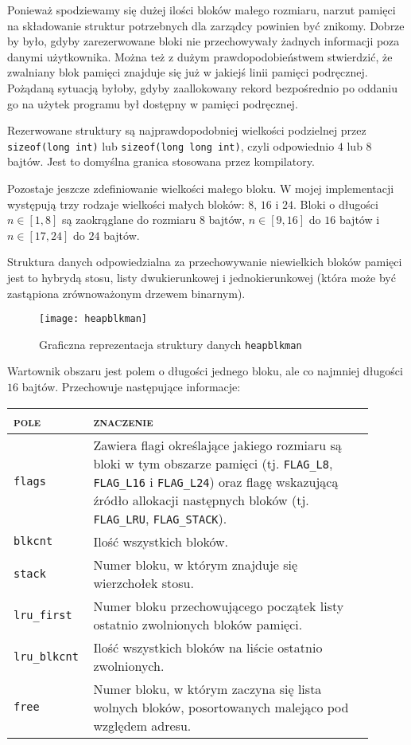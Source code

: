 \documentclass[12pt,a4paper,titlepage,twoside]{mwart}
\begin{document}
Ponieważ spodziewamy się dużej ilości bloków małego rozmiaru, narzut pamięci na
składowanie struktur potrzebnych dla zarządcy powinien być znikomy. Dobrze by
było, gdyby zarezerwowane bloki nie przechowywały żadnych informacji poza
danymi użytkownika. Można też z dużym prawdopodobieństwem stwierdzić, że
zwalniany blok pamięci znajduje się już w jakiejś linii pamięci podręcznej.
Pożądaną sytuacją byłoby, gdyby zaallokowany rekord bezpośrednio po oddaniu go
na użytek programu był dostępny w pamięci podręcznej.

Rezerwowane struktury są najprawdopodobniej wielkości podzielnej przez
\texttt{sizeof(long int)} lub \texttt{sizeof(long long int)}, czyli odpowiednio
$4$ lub $8$ bajtów. Jest to domyślna granica stosowana przez kompilatory.

Pozostaje jeszcze zdefiniowanie wielkości małego bloku. W mojej implementacji
występują trzy rodzaje wielkości małych bloków: $8$, $16$ i $24$. Bloki o
długości $n \in [1,8]$ są zaokrąglane do rozmiaru $8$ bajtów, $n \in [9,16]$ do
$16$ bajtów i $n \in [17,24]$ do $24$ bajtów.

Struktura danych odpowiedzialna za przechowywanie niewielkich bloków pamięci
jest to hybrydą stosu, listy dwukierunkowej i jednokierunkowej (która może być
zastąpiona zrównoważonym drzewem binarnym).

\begin{figure}[h]
\centering
\texttt{[image: heapblkman]}
\caption{Graficzna reprezentacja struktury danych \texttt{heapblkman}}
\end{figure}

Wartownik obszaru jest polem o długości jednego bloku, ale co najmniej długości
$16$ bajtów. Przechowuje następujące informacje:
\begin{center}
\begin{tabular}{|m{0.15\linewidth}|p{0.75\linewidth}|}
\hline
\textsc{pole} & \textsc{znaczenie} \\
\hline
\hline
\verb+flags+		& Zawiera flagi określające jakiego rozmiaru są bloki w tym
obszarze pamięci (tj. \verb+FLAG_L8+, \verb+FLAG_L16+ i \verb+FLAG_L24+) oraz
flagę wskazującą źródło allokacji następnych bloków (tj. \verb+FLAG_LRU+,
\verb+FLAG_STACK+). \\
\hline
\verb+blkcnt+		& Ilość wszystkich bloków. \\
\hline
\verb+stack+		& Numer bloku, w którym znajduje się wierzchołek stosu. \\
\hline
\verb+lru_first+	& Numer bloku przechowującego początek listy ostatnio
zwolnionych bloków pamięci. \\
\hline
\verb+lru_blkcnt+	& Ilość wszystkich bloków na liście ostatnio zwolnionych. \\
\hline
\verb+free+			& Numer bloku, w którym zaczyna się lista wolnych bloków,
posortowanych malejąco pod względem adresu. \\
\hline
\end{tabular}
\end{center}
\end{document}
